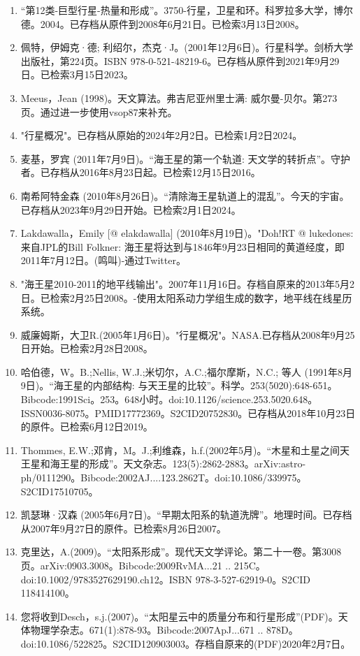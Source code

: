\begin{enumerate}
\item “第12类-巨型行星-热量和形成”。3750-行星，卫星和环。科罗拉多大学，博尔德。2004。已存档从原件到2008年6月21日。已检索3月13日2008。
\item 佩特，伊姆克·德; 利绍尔，杰克·J。(2001年12月6日)。行星科学。剑桥大学出版社，第224页。ISBN 978-0-521-48219-6。已存档从原件到2021年9月29日。已检索3月15日2023。
\item Meeus，Jean (1998)。天文算法。弗吉尼亚州里士满: 威尔曼-贝尔。第273页。通过进一步使用vsop87来补充。
\item "行星概况"。已存档从原始的2024年2月2日。已检索1月2日2024。
\item 麦基，罗宾 (2011年7月9日)。“海王星的第一个轨道: 天文学的转折点”。守护者。已存档从2016年8月23日起。已检索12月15日2016。
\item 南希阿特金森 (2010年8月26日)。“清除海王星轨道上的混乱”。今天的宇宙。已存档从2023年9月29日开始。已检索2月1日2024。
\item Lakdawalla，Emily [@ elakdawalla] (2010年8月19日)。"Doh!RT @ lukedones: 来自JPL的Bill Folkner: 海王星将达到与1846年9月23日相同的黄道经度，即2011年7月12日。(鸣叫)-通过Twitter。
\item "海王星2010-2011的地平线输出"。2007年11月16日。存档自原来的2013年5月2日。已检索2月25日2008。-使用太阳系动力学组生成的数字，地平线在线星历系统。
\item 威廉姆斯，大卫R.(2005年1月6日)。"行星概况"。NASA.已存档从2008年9月25日开始。已检索2月28日2008。
\item 哈伯德，W。B.;Nellis, W.J.;米切尔，A.C.;福尔摩斯，N.C.; 等人 (1991年8月9日)。“海王星的内部结构: 与天王星的比较”。科学。253(5020):648-651。Bibcode:1991Sci。253。648小时。doi:10.1126/science.253.5020.648。ISSN0036-8075。PMID17772369。S2CID20752830。已存档从2018年10月23日的原件。已检索6月12日2019。   
\item Thommes, E.W.;邓肯，M。J.;利维森，h.f.(2002年5月)。“木星和土星之间天王星和海王星的形成”。天文杂志。123(5):2862-2883。arXiv:astro-ph/0111290。Bibcode:2002AJ....123.2862T。doi:10.1086/339975。S2CID17510705。 
\item 凯瑟琳·汉森 (2005年6月7日)。“早期太阳系的轨道洗牌”。地理时间。已存档从2007年9月27日的原件。已检索8月26日2007。
\item 克里达，A.(2009)。“太阳系形成”。现代天文学评论。第二十一卷。第3008页。arXiv:0903.3008。Bibcode:2009RvMA...21 .. 215C。doi:10.1002/9783527629190.ch12。ISBN  978-3-527-62919-0。S2CID 118414100。
\item 您将收到Desch，s.j.(2007)。“太阳星云中的质量分布和行星形成”(PDF)。天体物理学杂志。671(1):878-93。Bibcode:2007ApJ...671 .. 878D。doi:10.1086/522825。S2CID120903003。存档自原来的(PDF)2020年2月7日。  

\end{enumerate}
